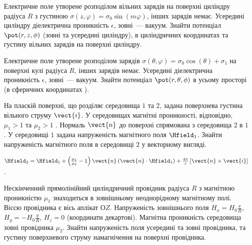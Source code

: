 \begin{problem}
Електричне поле утворене розподілом вільних зарядів на поверхні циліндру радіуса $R$ з густиною $\sigma (z,\varphi ) = \sigma _0\sin (m\varphi )$, інших зарядів немає. Усередині циліндру діелектрична проникність $\epsilon$, зовні~--- вакуум. Знайти потенціал $\pot(r,z,\phi)$ (зовні та усередині циліндру), в циліндричних координатах  та густину вільних зарядів на поверхні циліндру.
\end{problem}

\begin{problem}
Електричне поле утворене розподілом зарядів $\sigma (\theta ,\varphi ) = {\sigma _0}\cos (\theta ) + \sigma _1$   на поверхні кулі радіуса $R$, інших зарядів немає. Усередині діелектрична проникність $\epsilon$, зовні~--- вакуум. Знайти потенціал  $\pot(r,\theta,\phi)$ в усьому просторі (в сферичних координатах ).
\end{problem}

\begin{problem}
    На пласкій поверхні, що розділяє середовища $1$ та $2$, задана поверхнева густина вільного струму $\vect{i}$. У середовищах магнітні проникності, відповідно, $\mu_1 > 1$ та $\mu_2 > 1$ . Нормаль $\vect{n}$ до поверхні спрямована з середовища $2$ в $1$. У середовищі $1$ задана напруженість магнітного поля $\Hfield_1$. Знайти напруженість магнітного поля в середовищі $2$ у векторному вигляді.
\begin{solution}
    $\Hfield_2 = \Hfield_1 + \left( \frac{\mu_1}{\mu_2} - 1 \right)\vect{n}\left( \vect{n} \cdot \Hfield_1 \right) + \frac{4\pi}{c}\left[\vect{n}\times\vect{i}\right] $.
\end{solution}
\end{problem}

\begin{problem}
Нескінченний прямолінійний циліндричний провідник радіуса $R$  з магнітною проникністю $\mu_1$  знаходиться в зовнішньому неоднорідному магнітному полі. Віссю провідника є вісь аплікат $ОZ$. Напруженість зовнішнього поля $H_x = H_0\frac{x}{R}$, $H_y = - H_0\frac{y}{R}$, $H_z = 0$ (координати декартові). Магнітна проникність середовища зовні провідника $\mu_2$. Знайти напруженість поля усередині та зовні провідника, та густину поверхневого струму намагнічення на поверхні провідника.
\end{problem}

